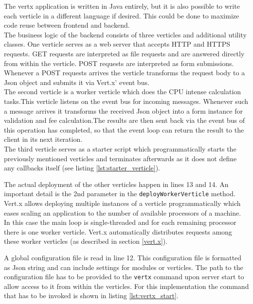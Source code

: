 The vertx application is written in Java entirely, but it is also possible to
write each verticle in a different language if desired. This could be done to
maximize code reuse between frontend and backend.\\
The business logic of the backend consists of three verticles and additional
utility classes.
One verticle serves as a web server that accepts HTTP and HTTPS requests. GET
requests are interpreted as file requests and are answered directly from within
the verticle. POST requests are interpreted as form submissions. Whenever a POST
requests arrives the verticle transforms the request body to a Json object and
submits it via Vert.x' event bus.\\
The second verticle is a worker verticle which does the CPU intense calculation
tasks.This verticle listens on the event bus for incoming messages. Whenever
such a message arrives it transforms the received Json object into a form
instance for validation and fee calculation.The results are then sent back via
the event bus of this operation has completed, so that the event loop can return
the result to the client in its next iteration.\\
The third verticle serves as a starter script which programmatically starts
the previously mentioned verticles and terminates afterwards as it does not
define any callbacks itself (see listing \ref{lst:starter_verticle}).



The actual deployment of the other verticles happen in lines 13 and 14.
An important detail is the 2nd parameter in the \texttt{deployWorkerVerticle} method.
Vert.x allows deploying multiple instances of a verticle programmatically
which eases scaling an application to the number of available processors of a machine.
In this case the main loop is single-threaded and for each remaining processor
there is one worker verticle. Vert.x automatically distributes requests among
these worker verticles (as described in section \ref{vert.x}).

A global configuration file is read in line 12. This configuration file is
formatted as Json string and can include settings for modules or verticles. The
path to the configuration file has to be provided to the \texttt{vertx} command
upon server start to allow access to it from within the verticles. For this implementation the command that
has to be invoked is shown in listing \ref{lst:vertx_start}.

